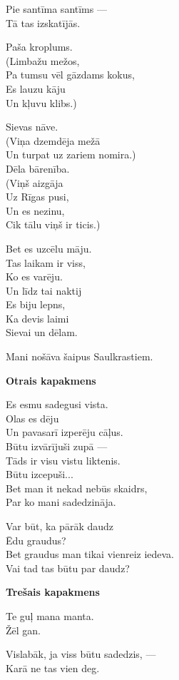 \documentclass[14pt]{extarticle}
\begin{document}
Pie santīma santīms ---\\
Tā tas izskatījās.

Paša kroplums.\\
(Limbažu mežos,\\
Pa tumsu vēl gāzdams kokus,\\
Es lauzu kāju\\
Un kļuvu klibs.)

Sievas nāve.\\
(Viņa dzemdēja mežā\\
Un turpat uz zariem nomira.)\\
Dēla bārenība.\\
(Viņš aizgāja\\
Uz Rīgas pusi,\\
Un es nezinu,\\
Cik tālu viņš ir ticis.)

Bet es uzcēlu māju.\\
Tas laikam ir viss,\\
Ko es varēju.\\
Un līdz tai naktij\\
Es biju lepns,\\
Ka devis laimi\\
Sievai un dēlam.

Mani nošāva šaipus Saulkrastiem.

\newpage

{\bf Otrais kapakmens}

Es esmu sadegusi vista.\\
Olas es dēju\\
Un pavasarī izperēju cāļus.\\
Būtu izvārījuši zupā ---\\
Tāds ir visu vistu liktenis.\\
Būtu izcepuši...\\
Bet man it nekad nebūs skaidrs,\\
Par ko mani sadedzināja.

Var būt, ka pārāk daudz\\
Ēdu graudus?\\
Bet graudus man tikai vienreiz iedeva.\\
Vai tad tas būtu par daudz?

\newpage

{\bf Trešais kapakmens}

Te guļ mana manta.\\
Žēl gan.

Vislabāk, ja viss būtu sadedzis, ---\\
Karā ne tas vien deg.
\end{document}
